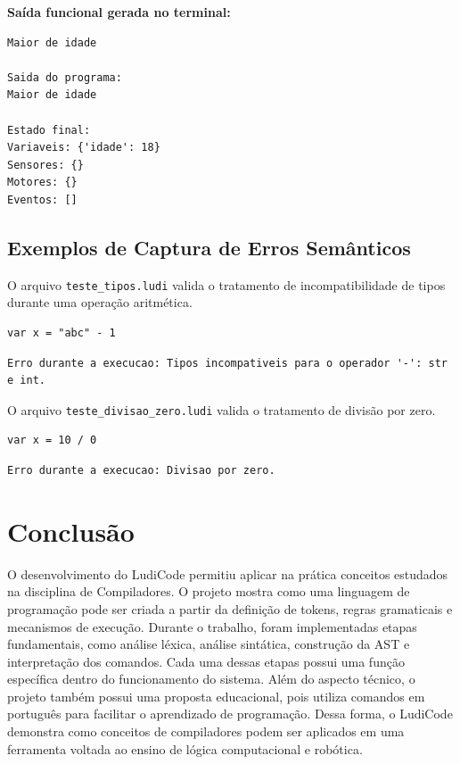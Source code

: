 \documentclass[12pt,a4paper]{article}
\begin{document}
\textbf{Saída funcional gerada no terminal:}
\begin{lstlisting}[language={}, numbers=none, frame=single, caption={Saída do console para desvio condicional}]
Maior de idade

Saida do programa:
Maior de idade

Estado final:
Variaveis: {'idade': 18}
Sensores: {}
Motores: {}
Eventos: []
\end{lstlisting}

\subsection{Exemplos de Captura de Erros Semânticos}

O arquivo \texttt{teste\_tipos.ludi} valida o tratamento de incompatibilidade de tipos durante uma operação aritmética.

\begin{lstlisting}[caption={tests/teste\_tipos.ludi}]
var x = "abc" - 1
\end{lstlisting}
\begin{lstlisting}[language={}, numbers=none, frame=single, caption={Log de erro para tipos incompatíveis}]
Erro durante a execucao: Tipos incompativeis para o operador '-': str e int.
\end{lstlisting}

O arquivo \texttt{teste\_divisao\_zero.ludi} valida o tratamento de divisão por zero.

\begin{lstlisting}[caption={tests/teste\_divisao\_zero.ludi}]
var x = 10 / 0
\end{lstlisting}
\begin{lstlisting}[language={}, numbers=none, frame=single, caption={Log de erro para divisão por zero}]
Erro durante a execucao: Divisao por zero.
\end{lstlisting}


\section{Conclusão}

O desenvolvimento do LudiCode permitiu aplicar na prática conceitos estudados na disciplina de Compiladores. O projeto mostra como uma linguagem de programação pode ser criada a partir da definição de tokens, regras gramaticais e mecanismos de execução. Durante o trabalho, foram implementadas etapas fundamentais, como análise léxica, análise sintática, construção da AST e interpretação dos comandos. Cada uma dessas etapas possui uma função específica dentro do funcionamento do sistema.
Além do aspecto técnico, o projeto também possui uma proposta educacional, pois utiliza comandos em português para facilitar o aprendizado de programação. Dessa forma, o LudiCode demonstra como conceitos de compiladores podem ser aplicados em uma ferramenta voltada ao ensino de lógica computacional e robótica.
\end{document}
